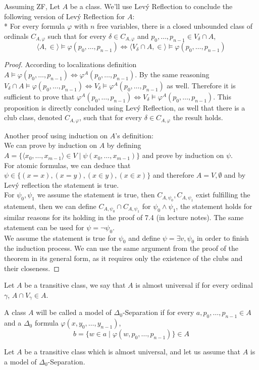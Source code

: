 \question{}
Assuming ZF, Let $A$ be a class. We'll use Lev\'y Reflection to conclude the following version of Lev\'y Reflection for $A$: \\*
For every formula $\varphi$ with $n$ free variables, there is a closed unbounded class of ordinals $C_{A, \varphi}$ such that for every $\delta \in C_{A, \varphi}$ and $p_0, \dots, p_{n - 1} \in V_\delta \cap A$,
\[
	\langle A, \in \rangle \models \varphi(p_0, \dots, p_{n - 1})
	\iff \langle V_\delta \cap A, \in \rangle \models \varphi(p_0, \dots, p_{n - 1})
\]
\begin{proof}
	According to localizations definition $A \models \varphi(p_0, \dots, p_{n - 1}) \iff \varphi^A(p_0, \dots, p_{n - 1})$.
	By the same reasoning $V_\delta \cap A \models \varphi(p_0, \dots, p_{n - 1}) \iff V_\delta \models \varphi^A(p_0, \dots, p_{n - 1})$ as well.
	Therefore it is sufficient to prove that $\varphi^A(p_0, \dots, p_{n - 1}) \iff V_\delta \models \varphi^A(p_0, \dots, p_{n - 1})$.
	This proposition is directly concluded using Lev\'y Reflection, as well that there is a club class, denoted $C_{A, \varphi}$, such that for every $\delta \in C_{A, \varphi}$ the result holds.


	Another proof using induction on $A$'s definition: \\
	We can prove by induction on $A$ by defining $A = \{ \langle x_0, \dots, x_{m - 1} \rangle \in V \mid \psi(x_0, \dots, x_{m - 1}) \}$ and prove by induction on $\psi$. \\
	For atomic formulas, we can deduce that $\psi \in \{ (x = x), (x = y), (x \in y), (x \in x) \}$ and therefore $A = V, \emptyset$ and by Lev\'y reflection the statement is true. \\
	For $\psi_0, \psi_1$ we assume the statement is true, then $C_{A, \psi_0}, C_{A, \psi_1}$ exist fulfilling the statement,
	then we can define $C_{A, \psi_0} \cap C_{A, \psi_1}$ for $\psi_0 \land \psi_1$, the statement holds for similar reasons for its holding in the proof of 7.4 (in lecture notes).
	The same statement can be used for $\psi = \lnot \psi_0$. \\
	We assume the statement is true for $\psi_0$ and define $\psi = \exists v, \psi_0$ in order to finish the induction process.
	We can use the same argument from the proof of the theorem in its general form, as it requires only the existence of the clubs and their closeness.
\end{proof}

\question{}
\begin{definition*}
	Let $A$ be a transitive class, we say that $A$ is almost universal if for every ordinal $\gamma$, $A \cap V_\gamma \in A$.
\end{definition*}
\begin{definition*}
	A class $A$ will be called a model of $\Delta_0$-Separation if for every $a, p_0, \dots, p_{n - 1} \in A$ and a $\Delta_0$ formula $\varphi(x, y_0, \dots, y_{n - 1})$,
	\[
		b = \{ w \in a \mid \varphi(w, p_0, \dots, p_{n - 1})\} \in A
	\]
\end{definition*}
Let $A$ be a transitive class which is almost universal, and let us assume that $A$ is a model of $\Delta_0$-Separation.

